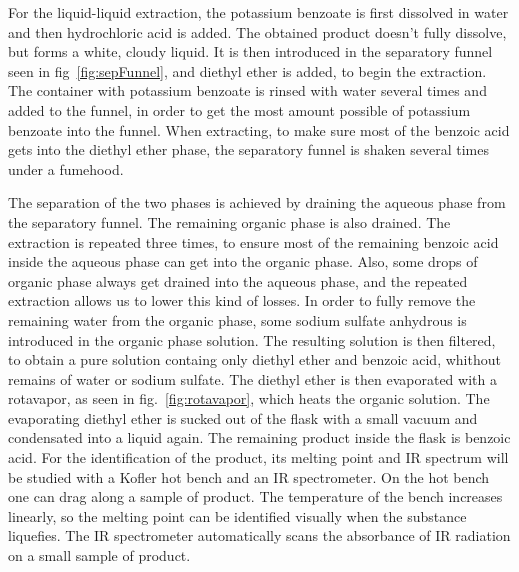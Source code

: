 \documentclass{article}
\begin{document}
For the liquid-liquid extraction, the potassium benzoate is first dissolved in water and then hydrochloric acid is added. The obtained product doesn't fully dissolve, but forms a white, cloudy liquid. It is then introduced in the separatory funnel seen in fig~\ref{fig:sepFunnel}, and diethyl ether is added, to begin the extraction. The container with potassium benzoate is rinsed with water several times and added to the funnel, in order to get the most amount possible of potassium benzoate into the funnel. When extracting, to make sure most of the benzoic acid gets into the diethyl ether phase, the separatory funnel is shaken several times under a fumehood.

The separation of the two phases is achieved by draining the aqueous phase from the separatory funnel. The remaining organic phase is also drained. The extraction is repeated three times, to ensure most of the remaining benzoic acid inside the aqueous phase can get into the organic phase. Also, some drops of organic phase always get drained into the aqueous phase, and the repeated extraction allows us to lower this kind of losses. In order to fully remove the remaining water from the organic phase, some sodium sulfate anhydrous is introduced in the organic phase solution. The resulting solution is then filtered, to obtain a pure solution containg only diethyl ether and benzoic acid, whithout remains of water or sodium sulfate. The diethyl ether is then evaporated with a rotavapor, as seen in fig.~\ref{fig:rotavapor}, which heats the organic solution. The evaporating diethyl ether is sucked out of the flask with a small vacuum and condensated into a liquid again. The remaining product inside the flask is benzoic acid.
For the identification of the product, its melting point and IR spectrum will be studied with a Kofler hot bench and an IR spectrometer. On the hot bench one can drag along a sample of product. The temperature of the bench increases linearly, so the melting point can be identified visually when the substance liquefies. The IR spectrometer automatically scans the absorbance of IR radiation on a small sample of product.
\end{document}

